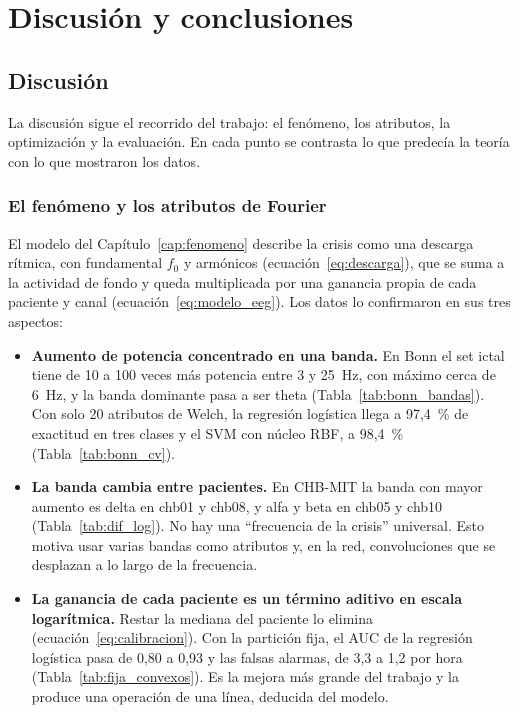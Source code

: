 \chapter{Discusión y conclusiones}
\label{cap:conclusiones}

\section{Discusión}

La discusión sigue el recorrido del trabajo: el fenómeno, los atributos, la optimización y la evaluación. En cada punto
se contrasta lo que predecía la teoría con lo que mostraron los datos.

\subsection{El fenómeno y los atributos de Fourier}

El modelo del Capítulo~\ref{cap:fenomeno} describe la crisis como una descarga rítmica, con fundamental $f_0$ y
armónicos (ecuación~\eqref{eq:descarga}), que se suma a la actividad de fondo y queda multiplicada por una ganancia
propia de cada paciente y canal (ecuación~\eqref{eq:modelo_eeg}). Los datos lo confirmaron en sus tres aspectos:
\begin{itemize}
  \item \textbf{Aumento de potencia concentrado en una banda.} En Bonn el set ictal tiene de 10 a 100 veces más potencia
        entre 3 y 25~Hz, con máximo cerca de 6~Hz, y la banda dominante pasa a ser theta (Tabla~\ref{tab:bonn_bandas}).
        Con solo 20 atributos de Welch, la regresión logística llega a 97,4~\% de exactitud en tres clases y el SVM con
        núcleo RBF, a 98,4~\% (Tabla~\ref{tab:bonn_cv}).
  \item \textbf{La banda cambia entre pacientes.} En CHB-MIT la banda con mayor aumento es delta en chb01 y chb08, y alfa y
        beta en chb05 y chb10 (Tabla~\ref{tab:dif_log}). No hay una ``frecuencia de la crisis'' universal. Esto motiva usar
        varias bandas como atributos y, en la red, convoluciones que se desplazan a lo largo de la frecuencia.
  \item \textbf{La ganancia de cada paciente es un término aditivo en escala logarítmica.} Restar la mediana del paciente lo
        elimina (ecuación~\eqref{eq:calibracion}). Con la partición fija, el AUC de la regresión logística pasa de 0,80 a
        0,93 y las falsas alarmas, de 3,3 a 1,2 por hora (Tabla~\ref{tab:fija_convexos}). Es la mejora más grande del
        trabajo y la produce una operación de una línea, deducida del modelo.
\end{itemize}


